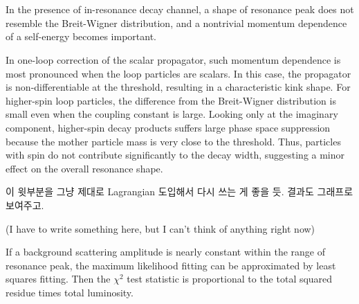 \documentclass[11pt]{article}
\theoremstyle{definition}
\theoremstyle{remark}
\begin{document}
	\section{}
	In the presence of in-resonance decay channel, a shape of resonance peak does not resemble the Breit-Wigner distribution, and a nontrivial momentum dependence of a self-energy becomes important.
	
	In one-loop correction of the scalar propagator, such momentum dependence is most pronounced when the loop particles are scalars.
	In this case, the propagator is non-differentiable at the threshold, resulting in a characteristic kink shape.
	For higher-spin loop particles, the difference from the Breit-Wigner distribution is small even when the coupling constant is large.
	Looking only at the imaginary component, higher-spin decay products suffers large phase space suppression because the mother particle mass is very close to the threshold.
	Thus, particles with spin do not contribute significantly to the decay width, suggesting a minor effect on the overall resonance shape.
	
	이 윗부분을 그냥 제대로 Lagrangian 도입해서 다시 쓰는 게 좋을 듯. 결과도 그래프로 보여주고.
	
	(I have to write something here, but I can't think of anything right now)
	
	If a background scattering amplitude is nearly constant within the range of resonance peak, the maximum likelihood fitting can be approximated by least squares fitting.
	Then the $\chi^{2}$ test statistic is proportional to the total squared residue times total luminosity.
	
\end{document}
